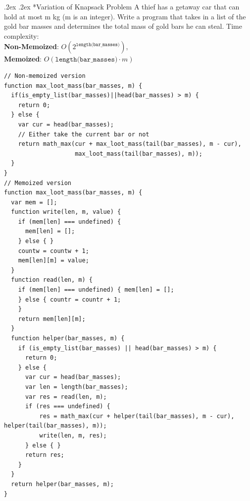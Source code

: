 \documentclass[10pt,portrait,a4paper]{article}
\makeatletter
\renewcommand{\subsection}{\@startsection{subsection}{1}{0mm}%
                                {.2ex}%
                                {.2ex}%
                                {\sffamily\bfseries}}
\makeatother
\begin{document}
\begin{multicols*}{4}
  \subsection*{Variation of Knapsack Problem}
  A thief has a getaway car that can hold at most m kg (m is an integer). Write a program that takes in a list of the gold bar masses and determines the total mass of gold bars he can steal. Time complexity:\\
  \textbf{Non-Memoized}: $O(2^{\texttt{length(bar\_masses)}})$,\\
  \textbf{Memoized}: $O(\texttt{length(bar\_masses)}\cdot m)$
  \begin{verbatim}
// Non-memoized version
function max_loot_mass(bar_masses, m) {
  if(is_empty_list(bar_masses)||head(bar_masses) > m) {
    return 0;
  } else {
    var cur = head(bar_masses);
    // Either take the current bar or not
    return math_max(cur + max_loot_mass(tail(bar_masses), m - cur),
                    max_loot_mass(tail(bar_masses), m));
  }
}
// Memoized version
function max_loot_mass(bar_masses, m) {
  var mem = [];
  function write(len, m, value) {
    if (mem[len] === undefined) {
      mem[len] = [];
    } else { }
    countw = countw + 1;
    mem[len][m] = value;
  }
  function read(len, m) {
    if (mem[len] === undefined) { mem[len] = [];
    } else { countr = countr + 1;
    }
    return mem[len][m];
  }
  function helper(bar_masses, m) {
    if (is_empty_list(bar_masses) || head(bar_masses) > m) {
      return 0;
    } else {
      var cur = head(bar_masses);
      var len = length(bar_masses);
      var res = read(len, m);
      if (res === undefined) {
          res = math_max(cur + helper(tail(bar_masses), m - cur), helper(tail(bar_masses), m));
          write(len, m, res);
      } else { }
      return res;
    }
  }
  return helper(bar_masses, m);
}
\end{verbatim}


\end{multicols*}
\end{document}
